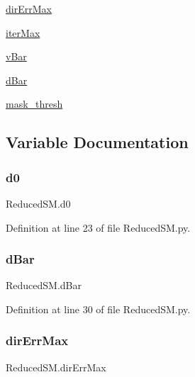 \begin{DoxyCompactItemize}
\item 
\mbox{\hyperlink{namespace_reduced_s_m_ae6a8b93203810f4021fccd67a05f51e7}{dir\+Err\+Max}}
\item 
\mbox{\hyperlink{namespace_reduced_s_m_aef5d3f10407f244dce4feddcf7947ed3}{iter\+Max}}
\item 
\mbox{\hyperlink{namespace_reduced_s_m_a0e80246040e2942e9ccee8ec8ee7313c}{v\+Bar}}
\item 
\mbox{\hyperlink{namespace_reduced_s_m_a54a76d567f185562d0afbd302b2764ab}{d\+Bar}}
\item 
\mbox{\hyperlink{namespace_reduced_s_m_a2a76625af709255ac745eda01a83142a}{mask\+\_\+thresh}}
\end{DoxyCompactItemize}


\subsection{Variable Documentation}
\mbox{\label{namespace_reduced_s_m_af7214d9d46df1ff209b258941ec86497}} 
\subsubsection{\texorpdfstring{d0}{d0}}
{\footnotesize\ttfamily Reduced\+S\+M.\+d0}



Definition at line 23 of file Reduced\+S\+M.\+py.

\mbox{\label{namespace_reduced_s_m_a54a76d567f185562d0afbd302b2764ab}} 
\subsubsection{\texorpdfstring{d\+Bar}{dBar}}
{\footnotesize\ttfamily Reduced\+S\+M.\+d\+Bar}



Definition at line 30 of file Reduced\+S\+M.\+py.

\mbox{\label{namespace_reduced_s_m_ae6a8b93203810f4021fccd67a05f51e7}} 
\subsubsection{\texorpdfstring{dir\+Err\+Max}{dirErrMax}}
{\footnotesize\ttfamily Reduced\+S\+M.\+dir\+Err\+Max}




